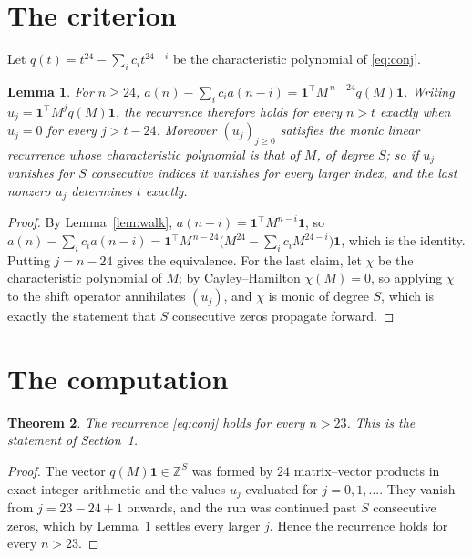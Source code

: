\documentclass[11pt,a4paper]{article}
\theoremstyle{plain}
\newtheorem{theorem}{Theorem}
\newtheorem{lemma}[theorem]{Lemma}
\theoremstyle{definition}
\begin{document}
\section{The criterion}

Let $q(t)=t^{24}-\sum_i c_i t^{24-i}$ be the characteristic polynomial of
\eqref{eq:conj}.

\begin{lemma}\label{lem:crit}
For $n\ge24$,
$a(n)-\sum_i c_i a(n-i)=\mathbf{1}^{\!\top}M^{\,n-24}q(M)\mathbf{1}$. Writing
$u_j=\mathbf{1}^{\!\top}M^{j}q(M)\mathbf{1}$, the recurrence therefore holds for every
$n>t$ exactly when $u_j=0$ for every $j>t-24$. Moreover $(u_j)_{j\ge0}$ satisfies the
monic linear recurrence whose characteristic polynomial is that of $M$, of degree $S$; so
if $u_j$ vanishes for $S$ consecutive indices it vanishes for every larger index, and the
last nonzero $u_j$ determines $t$ exactly.
\end{lemma}

\begin{proof}
By Lemma~\ref{lem:walk}, $a(n-i)=\mathbf{1}^{\!\top}M^{n-i}\mathbf{1}$, so
$a(n)-\sum_i c_i a(n-i)
=\mathbf{1}^{\!\top}M^{\,n-24}\bigl(M^{24}-\sum_i c_i M^{24-i}\bigr)
\mathbf{1}$, which is the identity. Putting $j=n-24$ gives the equivalence. For the
last claim, let $\chi$ be the characteristic polynomial of $M$; by Cayley--Hamilton
$\chi(M)=0$, so applying $\chi$ to the shift operator annihilates $(u_j)$, and $\chi$ is
monic of degree $S$, which is exactly the statement that $S$ consecutive zeros propagate
forward.
\end{proof}

\section{The computation}

\begin{theorem}
The recurrence \eqref{eq:conj} holds for every $n>23$. This is the statement of
Section~1.
\end{theorem}

\begin{proof}
The vector $q(M)\mathbf{1}\in\mathbb{Z}^{S}$ was formed by $24$ matrix--vector
products in exact integer arithmetic and the values $u_j$ evaluated for
$j=0,1,\dots$. They vanish from $j=23-24+1$ onwards, and the run was continued past
$S$ consecutive zeros, which by Lemma~\ref{lem:crit} settles every larger $j$. Hence the
recurrence holds for every $n>23$.
\end{proof}
\end{document}
